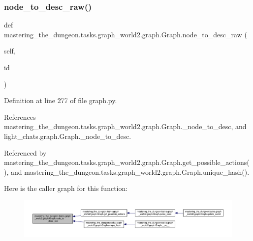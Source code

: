 \subsubsection{\texorpdfstring{node\+\_\+to\+\_\+desc\+\_\+raw()}{node\_to\_desc\_raw()}}
{\footnotesize\ttfamily def mastering\+\_\+the\+\_\+dungeon.\+tasks.\+graph\+\_\+world2.\+graph.\+Graph.\+node\+\_\+to\+\_\+desc\+\_\+raw (\begin{DoxyParamCaption}\item[{}]{self,  }\item[{}]{id }\end{DoxyParamCaption})}



Definition at line 277 of file graph.\+py.



References mastering\+\_\+the\+\_\+dungeon.\+tasks.\+graph\+\_\+world2.\+graph.\+Graph.\+\_\+node\+\_\+to\+\_\+desc, and light\+\_\+chats.\+graph.\+Graph.\+\_\+node\+\_\+to\+\_\+desc.



Referenced by mastering\+\_\+the\+\_\+dungeon.\+tasks.\+graph\+\_\+world2.\+graph.\+Graph.\+get\+\_\+possible\+\_\+actions(), and mastering\+\_\+the\+\_\+dungeon.\+tasks.\+graph\+\_\+world2.\+graph.\+Graph.\+unique\+\_\+hash().

Here is the caller graph for this function\+:
\nopagebreak
\begin{figure}[H]
\begin{center}
\leavevmode
\includegraphics[width=350pt]{classmastering__the__dungeon_1_1tasks_1_1graph__world2_1_1graph_1_1Graph_a3d1c3b4c1ddc901d6b6d7dd59c9b1399_icgraph}
\end{center}
\end{figure}
\mbox{\label{classmastering__the__dungeon_1_1tasks_1_1graph__world2_1_1graph_1_1Graph_ac0f86925261cb5f95202f17b41c2832f}} 
